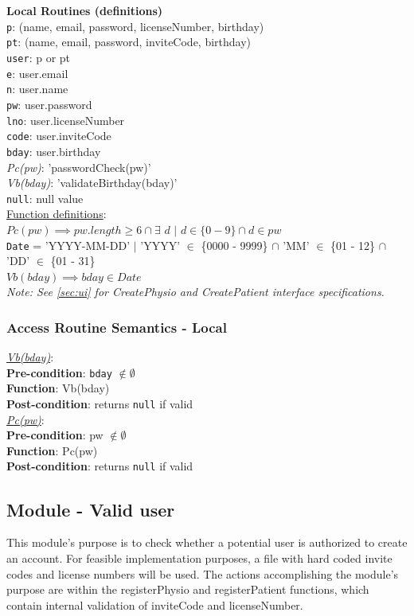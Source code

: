 \documentclass[12pt, titlepage]{article}
\begin{document}
\noindent \textbf{Local Routines (definitions)}\\
\texttt{p}: (name, email, password, licenseNumber, birthday)\\
\texttt{pt}: (name, email, password, inviteCode, birthday)\\
\texttt{user}: p or pt\\
\texttt{e}: user.email \\
\texttt{n}: user.name \\
\texttt{pw}: user.password\\
\texttt{lno}: user.licenseNumber\\
\texttt{code}: user.inviteCode\\
\texttt{bday}: user.birthday\\
\textit{Pc(pw)}: 'passwordCheck(pw)'\\
\textit{Vb(bday)}: 'validateBirthday(bday)' \\
\texttt{null}: null value\\


\noindent \underline{Function definitions}: \\
$Pc(pw) \implies pw.length \geq 6 \cap \exists$ $d$ $|$ $d \in \{0 - 9\} \cap d \in pw$ \\
\texttt{Date} = 'YYYY-MM-DD' $|$ 'YYYY' $\in$ \{0000 - 9999\} $\cap$ 'MM' $\in$ \{01 - 12\} $\cap$ 'DD' $\in$ \{01 - 31\} \\
$Vb(bday) \implies bday \in Date $ \\
\textit{Note: See \ref{sec:ui} for CreatePhysio and CreatePatient interface specifications.}

\subsubsection{Access Routine Semantics - Local}
\underline{\textit{Vb(bday)}}:\\
\textbf{Pre-condition}: \texttt{bday} $\notin \emptyset$\\
\textbf{Function}: Vb(bday)\\
\textbf{Post-condition}: returns \texttt{null} if valid \\
\underline{\textit{Pc(pw)}}:\\
\textbf{Pre-condition}: pw $\notin \emptyset$\\
\textbf{Function}: Pc(pw)\\
\textbf{Post-condition}: returns \texttt{null} if valid \\ 
\subsection{Module - Valid user}
This module's purpose is to check whether a potential user is authorized to create an account.
For feasible implementation purposes, a file with hard coded invite codes and license numbers will be used.
The actions accomplishing the module's purpose are within the registerPhysio and registerPatient functions,
which contain internal validation of inviteCode and licenseNumber.
\end{document}
